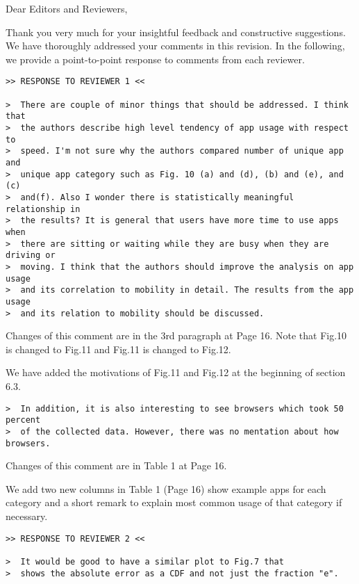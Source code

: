 \noindent Dear Editors and Reviewers,
\bigskip

Thank you very much for your insightful feedback and constructive suggestions. We have thoroughly addressed your comments %
in this revision. %
In the following, we provide a point-to-point response to comments from each reviewer.

\bigskip
\begin{verbatim}
>> RESPONSE TO REVIEWER 1 <<

>  There are couple of minor things that should be addressed. I think that
>  the authors describe high level tendency of app usage with respect to
>  speed. I'm not sure why the authors compared number of unique app and
>  unique app category such as Fig. 10 (a) and (d), (b) and (e), and (c)
>  and(f). Also I wonder there is statistically meaningful relationship in
>  the results? It is general that users have more time to use apps when
>  there are sitting or waiting while they are busy when they are driving or
>  moving. I think that the authors should improve the analysis on app usage
>  and its correlation to mobility in detail. The results from the app usage
>  and its relation to mobility should be discussed. 
\end{verbatim}

Changes of this comment are in the 3rd paragraph at Page 16. Note that Fig.10 is changed to Fig.11 and Fig.11 is changed to Fig.12.

We have added the motivations of Fig.11 and Fig.12 at the beginning of section 6.3.


\begin{verbatim}
>  In addition, it is also interesting to see browsers which took 50 percent 
>  of the collected data. However, there was no mentation about how browsers.
\end{verbatim}

Changes of this comment are in Table 1 at Page 16.

We add two new columns in Table 1 (Page 16) show example apps for each category and a short remark to explain most common usage of that category if necessary. 

\bigskip
\begin{verbatim}
>> RESPONSE TO REVIEWER 2 <<

>  It would be good to have a similar plot to Fig.7 that
>  shows the absolute error as a CDF and not just the fraction "e".
\end{verbatim}

